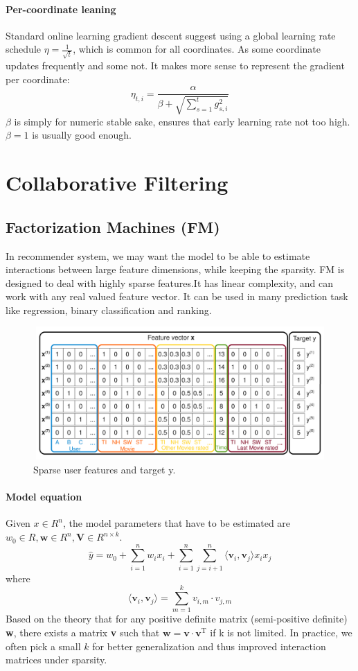 \documentclass{article}
\begin{document}
\paragraph{Per-coordinate leaning} Standard online learning gradient descent suggest using a global learning rate schedule $\eta=\frac{1}{\sqrt{t}}$, which is common for all coordinates. As some coordinate updates frequently and some not. It makes more sense to represent the gradient per coordinate:
$$\eta_{t,i}=\frac{\alpha}{\beta+\sqrt{\sum_{s=1}^{t}g^{2}_{s,i}}}$$
$\beta$ is simply for numeric stable sake, ensures that early learning rate not too high. $\beta=1$ is usually good enough. 
\section{Collaborative Filtering}
\subsection{Factorization Machines (FM)}
In recommender system, we may want the model to be able to estimate interactions between large feature dimensions, while keeping the sparsity.
FM \cite{DBLP:conf/icdm/Rendle10} is designed to deal with highly sparse features.It has linear complexity, and can work with any real valued feature vector. It can be used in many prediction task like regression, binary classification and ranking. 
\begin{figure}[H]
\centering
\includegraphics[width=5in,height=2in]{figure2}
\caption{Sparse user features and target y.}
\end{figure}
\paragraph{Model equation} Given $x \in R^{n}$, the model parameters that have to be estimated are $ w_{0} \in R, \textbf{w} \in R^{n}, \textbf{V} \in R^{n \times k}$.
$$\widehat{y}= w_{0}+\sum_{i=1}^{n}w_{i}x_{i}+\sum_{i=1}^{n}\sum_{j=i+1}^{n}\langle \textbf{v}_{i} ,\textbf{v}_{j} \rangle x_{i}x_{j}$$
where 
$$\langle \textbf{v}_{i} ,\textbf{v}_{j} \rangle =\sum_{m=1}^{k}v_{i,m} \cdot v_{j,m}$$
Based on the theory that for any positive definite matrix (semi-positive definite) \textbf{w}, there exists a matrix \textbf{v} such that $\textbf{w}=\textbf{v} \cdot \textbf{v}^\mathrm{T}$ if k is not limited. In practice, we often pick a small $k$ for better generalization
and thus improved interaction matrices under sparsity.
\end{document}
